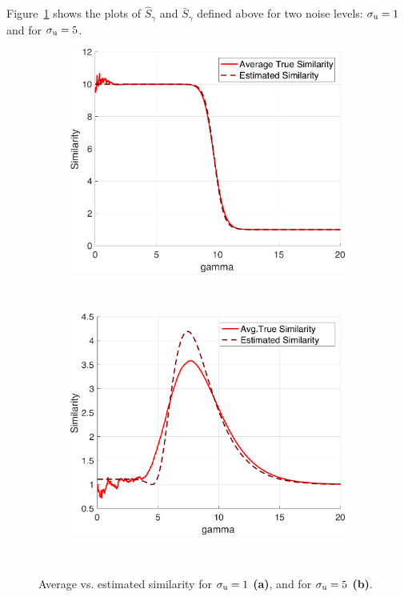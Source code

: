 Figure~\ref{fig:realVsEstimatedSimilarities} shows the plots of $\hat S_\gamma$ and
$\bar S_\gamma$ defined above for two noise levels: $\sigma_{\mathrm{u}}=1$ and for $\sigma_{\mathrm{u}}=5$.
\begin{figure}[ht!]
  \centering
  \begin{subfigure}[b]{.6\textwidth}
      \includegraphics[width=\linewidth]{figures/ch_generic_approach/realVsEstimatedSimilarities_sb1}
      \caption{}
  \end{subfigure}
  \\[.5cm]
  \begin{subfigure}[b]{.6\textwidth}
      \includegraphics[width=\linewidth]{figures/ch_generic_approach/realVsEstimatedSimilarities_sb5}
      \caption{}
  \end{subfigure}
  \\[.5cm]
  \caption{Average vs. estimated similarity for $\sigma_{\mathrm{u}}=1$ \textbf{(a)}, and for
    $\sigma_{\mathrm{u}}=5$ \textbf{(b)}.}
  \label{fig:realVsEstimatedSimilarities}
\end{figure}
